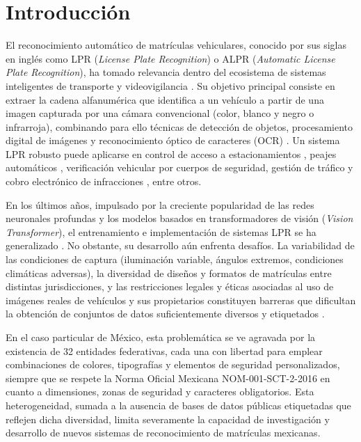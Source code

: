 \newpage
{}
\setcounter{page}{1}
\section{Introducción}
El reconocimiento automático de matrículas vehiculares, conocido por sus siglas en inglés como LPR (\textit{License Plate Recognition}) o ALPR (\textit{Automatic License Plate Recognition}), ha tomado relevancia dentro del ecosistema de sistemas inteligentes de transporte y videovigilancia \cite{chang-chen2004}. Su objetivo principal consiste en extraer la cadena alfanumérica que identifica a un vehículo a partir de una imagen capturada por una cámara convencional (color, blanco y negro o infrarroja), combinando para ello técnicas de detección de objetos, procesamiento digital de imágenes y reconocimiento óptico de caracteres (OCR) \cite{bohou-li2022}. Un sistema LPR robusto puede aplicarse en control de acceso a estacionamientos \cite{sirithinaphong-chamnongthai1999}, peajes automáticos \cite{davies-emmott1990}, verificación vehicular por cuerpos de seguridad, gestión de tráfico y cobro electrónico de infracciones \cite{yamaguchi-nagaya1999}, entre otros.

En los últimos años, impulsado por la creciente popularidad de las redes neuronales profundas y los modelos basados en transformadores de visión (\textit{Vision Transformer}), el entrenamiento e implementación de sistemas LPR se ha generalizado \cite{zherzdev-gruzdev2018, jain-sasindran2016, khan-ilyas2023}. No obstante, su desarrollo aún enfrenta desafíos. La variabilidad de las condiciones de captura (iluminación variable, ángulos extremos, condiciones climáticas adversas), la diversidad de diseños y formatos de matrículas entre distintas jurisdicciones, y las restricciones legales y éticas asociadas al uso de imágenes reales de vehículos y sus propietarios constituyen barreras que dificultan la obtención de conjuntos de datos suficientemente diversos y etiquetados \cite{du-ibrahim2013}.

En el caso particular de México, esta problemática se ve agravada por la existencia de 32 entidades federativas, cada una con libertad para emplear combinaciones de colores, tipografías y elementos de seguridad personalizados, siempre que se respete la Norma Oficial Mexicana NOM-001-SCT-2-2016 \cite{NOM001SCT22016} en cuanto a dimensiones, zonas de seguridad y caracteres obligatorios. Esta heterogeneidad, sumada a la ausencia de bases de datos públicas etiquetadas que reflejen dicha diversidad, limita severamente la capacidad de investigación y desarrollo de nuevos sistemas de reconocimiento de matrículas mexicanas.

